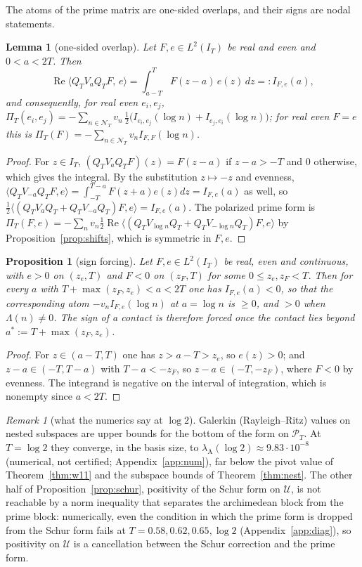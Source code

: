 \documentclass[11pt]{amsart}
\newtheorem{proposition}[theorem]{Proposition}
\newtheorem{lemma}[theorem]{Lemma}
\theoremstyle{definition}
\theoremstyle{remark}
\newtheorem{remark}[theorem]{Remark}
\newcommand{\Rel}{\operatorname{Re}}
\newcommand{\PT}{\mathcal P_T}
\newcommand{\IT}{I_T}
\newcommand{\NT}{\mathcal N_T}
\newcommand{\PiT}{\Pi_T}
\begin{document}
The atoms of the prime matrix are one-sided overlaps, and their signs are nodal statements.

\begin{lemma}[one-sided overlap]\label{lem:N}
Let $F,e\in L^2(\IT)$ be real and even and $0<a<2T$. Then
\[
\Rel\big\langle Q_TV_aQ_TF,\,e\big\rangle=\int_{a-T}^{T}F(z-a)\,e(z)\,dz=:I_{F,e}(a),
\]
and consequently, for real even $e_i,e_j$,
$\PiT(e_i,e_j)=-\sum_{n\in\NT}v_n\,\frac12\big(I_{e_i,e_j}(\log n)+I_{e_j,e_i}(\log n)\big)$; for real even $F=e$ this is
$\PiT(F)=-\sum_{n\in\NT}v_nI_{F,F}(\log n)$.
\end{lemma}
\begin{proof}
For $z\in\IT$, $(Q_TV_aQ_TF)(z)=F(z-a)$ if $z-a>-T$ and $0$ otherwise, which gives the integral. By the
substitution $z\mapsto-z$ and evenness, $\langle Q_TV_{-a}Q_TF,e\rangle=\int_{-T}^{T-a}F(z+a)e(z)dz=I_{F,e}(a)$ as well,
so $\frac12\langle(Q_TV_aQ_T+Q_TV_{-a}Q_T)F,e\rangle=I_{F,e}(a)$. The polarized prime form is
$\PiT(F,e)=-\sum_nv_n\frac12\Rel\langle(Q_TV_{\log n}Q_T+Q_TV_{-\log n}Q_T)F,e\rangle$ by Proposition~\ref{prop:shifts}, which
is symmetric in $F,e$.
\end{proof}

\begin{proposition}[sign forcing]\label{prop:G}
Let $F,e\in L^2(\IT)$ be real, even and continuous, with $e>0$ on $(z_e,T)$ and $F<0$ on $(z_F,T)$ for some
$0\le z_e,z_F<T$. Then for every $a$ with $T+\max(z_F,z_e)<a<2T$ one has $I_{F,e}(a)<0$, so that the corresponding
atom $-v_nI_{F,e}(\log n)$ at $a=\log n$ is $\ge0$, and $>0$ when $\Lambda(n)\ne0$. The sign of a contact is therefore
forced once the contact lies beyond $a^*:=T+\max(z_F,z_e)$.
\end{proposition}
\begin{proof}
For $z\in(a-T,T)$ one has $z>a-T>z_e$, so $e(z)>0$; and $z-a\in(-T,T-a)$ with $T-a<-z_F$, so $z-a\in(-T,-z_F)$,
where $F<0$ by evenness. The integrand is negative on the interval of integration, which is nonempty since $a<2T$.
\end{proof}

\begin{remark}[what the numerics say at $\log2$]\label{rem:galerkin}
Galerkin (Rayleigh--Ritz) values on nested subspaces are upper bounds for the bottom of the form on $\PT$. At
$T=\log2$ they converge, in the basis size, to $\lambda_{\mathrm A}(\log2)\approx9.83\cdot10^{-8}$ (numerical, not
certified; Appendix~\ref{app:num}), far below the pivot value of Theorem~\ref{thm:w11} and the subspace bounds of
Theorem~\ref{thm:nest}. The other half of Proposition~\ref{prop:schur}, positivity of the Schur form on $\mathcal U$, is
not reachable by a norm inequality that separates the archimedean block from the prime block: numerically, even
the condition in which the prime form is dropped from the Schur form fails at $T=0.58,0.62,0.65,\log2$
(Appendix~\ref{app:diag}), so positivity on $\mathcal U$ is a cancellation between the Schur correction and the prime
form.
\end{remark}
\end{document}
